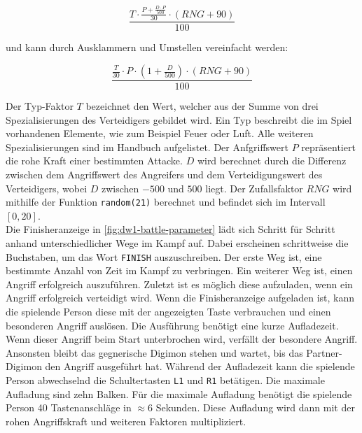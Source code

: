 \begin{equation}
  \frac{T \cdot \frac{P + \frac{D \cdot P}{500}}{30} \cdot (RNG + 90)}{100}
\end{equation}

und kann durch Ausklammern und Umstellen vereinfacht werden:

\begin{equation}
  \frac{\frac{T}{30} \cdot  P \cdot (1 + \frac{D}{500}) \cdot (RNG + 90)}{100}
\end{equation}

Der Typ-Faktor $T$ bezeichnet den Wert, welcher aus der Summe von drei Spezialisierungen des Verteidigers gebildet wird.
Ein Typ beschreibt die im Spiel vorhandenen Elemente, wie zum Beispiel Feuer oder Luft.
Alle weiteren Spezialisierungen sind im Handbuch aufgelistet.
Der Anfgriffswert $P$ repräsentiert die rohe Kraft einer bestimmten Attacke.
$D$ wird berechnet durch die Differenz zwischen dem Angriffswert des Angreifers und dem Verteidigungswert des Verteidigers, wobei $D$ zwischen $-500$ und $500$ liegt.
Der Zufallsfaktor $RNG$ wird mithilfe der Funktion \texttt{random(21)} berechnet und befindet sich im Intervall $[0, 20]$.\\

Die Finisheranzeige in \autoref{fig:dw1-battle-parameter} lädt sich Schritt für Schritt anhand unterschiedlicher Wege im Kampf auf.
Dabei erscheinen schrittweise die Buchstaben, um das Wort \texttt{FINISH} auszuschreiben.
Der erste Weg ist, eine bestimmte Anzahl von Zeit im Kampf zu verbringen.
Ein weiterer Weg ist, einen Angriff erfolgreich auszuführen.
Zuletzt ist es möglich diese aufzuladen, wenn ein Angriff erfolgreich verteidigt wird.
Wenn die Finisheranzeige aufgeladen ist, kann die spielende Person diese mit der angezeigten Taste verbrauchen und einen besonderen Angriff auslösen.
Die Ausführung benötigt eine kurze Aufladezeit.
Wenn dieser Angriff beim Start unterbrochen wird, verfällt der besondere Angriff.
Ansonsten bleibt das gegnerische Digimon stehen und wartet, bis das Partner-Digimon den Angriff ausgeführt hat.
Während der Aufladezeit kann die spielende Person abwechselnd die Schultertasten \texttt{L1} und \texttt{R1} betätigen.
Die maximale Aufladung sind zehn Balken.
Für die maximale Aufladung benötigt die spielende Person 40 Tastenanschläge in $\approx 6$ Sekunden.
Diese Aufladung wird dann mit der rohen Angriffskraft und weiteren Faktoren multipliziert.\\

